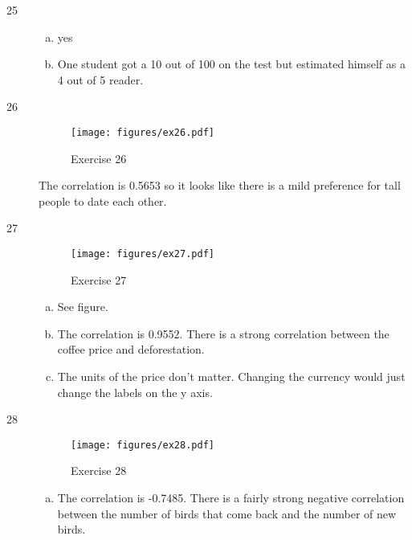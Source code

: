 \documentclass[letterpaper, landscape]{exam}
\begin{document}
  \ifprintanswers{}
    \begin{description}
      \item[25]     
        \begin{enumerate}[(a)]
          \item yes
          \item One student got a 10 out of 100 on the test but estimated
            himself as a 4 out of 5 reader.  
        \end{enumerate}
    
      \item[26]
        \begin{figure}[H]
          \centering
          \texttt{[image: figures/ex26.pdf]}
          \caption{Exercise 26}\label{fig:ex26}
        \end{figure}

        The correlation is 0.5653 so it looks like there is a mild preference
        for tall people to date each other.

      \item[27]
        \begin{figure}[H]
          \centering
          \texttt{[image: figures/ex27.pdf]}
          \caption{Exercise 27}
        \end{figure}\label{fig:ex27}

        \begin{enumerate}[(a)]
          \item See figure.

          \item
            The correlation is 0.9552.  There is a strong correlation between the
            coffee price and deforestation.

          \item
            The units of the price don't matter.  Changing the currency would
            just change the labels on the y axis.

        \end{enumerate}

      \item[28]
        \begin{figure}[H]
          \centering
          \texttt{[image: figures/ex28.pdf]}
          \caption{Exercise 28}
        \end{figure}\label{fig:ex28}

        \begin{enumerate}[(a)]
          \item The correlation is -0.7485.  There is a fairly strong negative
            correlation between the number of birds that come back and the
            number of new birds.


\end{enumerate}
\end{description}
\end{document}
